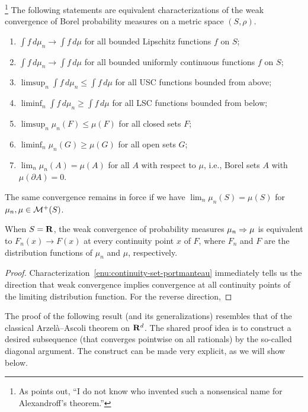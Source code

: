 \begin{namedthm} \label{thm:portmanteau-weak}\footnote{As \textcite{Bogachev_2018} points out, ``I do not know who invented such a nonsensical name for Alexandroff's theorem.''}
The following statements are equivalent characterizations of the weak convergence of Borel probability measures on a metric space $(S,\rho)$.
    \begin{enumerate}
        \item $\int f\,d\mu_n \to \int f\,d\mu$ for all bounded Lipschitz functions $f$ on $S$;
        \item $\int f\,d\mu_n \to \int f\,d\mu$ for all bounded uniformly continuous functions $f$ on $S$;
        \item $\limsup_n \int f\,d\mu_n \leq \int f\,d\mu$ for all USC functions bounded from above;
        \item $\liminf_n \int f\,d\mu_n \geq \int f\,d\mu$ for all LSC functions bounded from below;
        \item $\limsup_n \mu_n(F)\leq \mu(F)$ for all closed sets $F$;
        \item $\liminf_n \mu_n(G)\geq \mu(G)$ for all open sets $G$;
        \item \label{enu:continuity-set-portmanteau} $\lim_n \mu_n(A) = \mu(A)$ for all  $A$ with respect to $\mu$, i.e., Borel sets $A$ with $\mu(\partial A) = 0$.
    \end{enumerate}
\end{namedthm}
The same convergence remains in force if we have $\lim_n \mu_n(S) = \mu(S)$ for $\mu_n,\mu \in \mathcal{M}^+(S)$.

\begin{thm}
    When $S = \mathbf{R}$, the weak convergence of probability measures $\mu_n \Rightarrow \mu$ is equivalent to $F_n(x) \to F(x)$ at every continuity point $x$ of $F$, where $F_n$ and $F$ are the distribution functions of $\mu_n$ and $\mu$, respectively.
\end{thm}
\begin{proof}
    Characterization~\ref{enu:continuity-set-portmanteau} immediately tells us the direction that weak convergence implies convergence at all continuity points of the limiting distribution function. For the reverse direction, 
\end{proof}


The proof of the following result (and its generalizations) resembles that of the classical Arzelà--Ascoli theorem on $\mathbf{R}^d$. The shared proof idea is to construct a desired subsequence (that converges pointwise on all rationals) by the so-called diagonal argument. %
The construct can be made very explicit, as we will show below.

